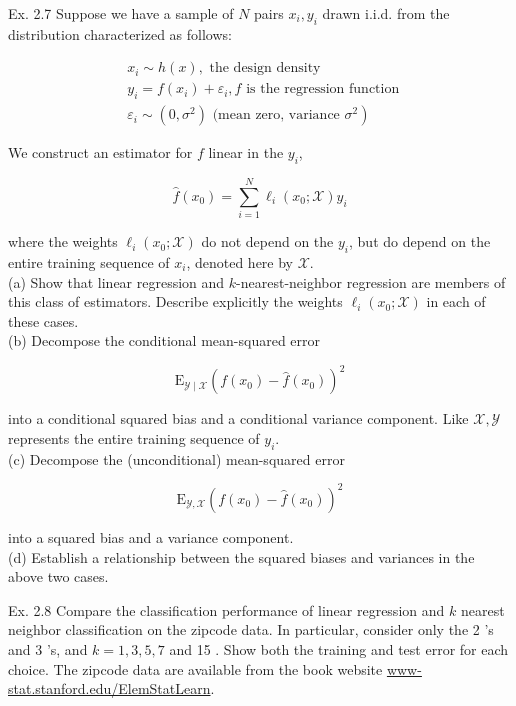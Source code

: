 \documentclass[10pt]{article}
\begin{document}
Ex. 2.7 Suppose we have a sample of $N$ pairs $x_{i}, y_{i}$ drawn i.i.d. from the distribution characterized as follows:

$$
\begin{aligned}
& x_{i} \sim h(x), \text { the design density } \\
& y_{i}=f\left(x_{i}\right)+\varepsilon_{i}, f \text { is the regression function } \\
& \left.\varepsilon_{i} \sim\left(0, \sigma^{2}\right) \text { (mean zero, variance } \sigma^{2}\right)
\end{aligned}
$$

We construct an estimator for $f$ linear in the $y_{i}$,

$$
\hat{f}\left(x_{0}\right)=\sum_{i=1}^{N} \ell_{i}\left(x_{0} ; \mathcal{X}\right) y_{i}
$$

where the weights $\ell_{i}\left(x_{0} ; \mathcal{X}\right)$ do not depend on the $y_{i}$, but do depend on the entire training sequence of $x_{i}$, denoted here by $\mathcal{X}$.\\
(a) Show that linear regression and $k$-nearest-neighbor regression are members of this class of estimators. Describe explicitly the weights $\ell_{i}\left(x_{0} ; \mathcal{X}\right)$ in each of these cases.\\
(b) Decompose the conditional mean-squared error

$$
\mathrm{E}_{\mathcal{Y} \mid \mathcal{X}}\left(f\left(x_{0}\right)-\hat{f}\left(x_{0}\right)\right)^{2}
$$

into a conditional squared bias and a conditional variance component. Like $\mathcal{X}, \mathcal{Y}$ represents the entire training sequence of $y_{i}$.\\
(c) Decompose the (unconditional) mean-squared error

$$
\mathrm{E}_{\mathcal{Y}, \mathcal{X}}\left(f\left(x_{0}\right)-\hat{f}\left(x_{0}\right)\right)^{2}
$$

into a squared bias and a variance component.\\
(d) Establish a relationship between the squared biases and variances in the above two cases.

Ex. 2.8 Compare the classification performance of linear regression and $k$ nearest neighbor classification on the zipcode data. In particular, consider only the 2 's and 3 's, and $k=1,3,5,7$ and 15 . Show both the training and test error for each choice. The zipcode data are available from the book website \href{http://www-stat.stanford.edu/ElemStatLearn}{www-stat.stanford.edu/ElemStatLearn}.
\end{document}
